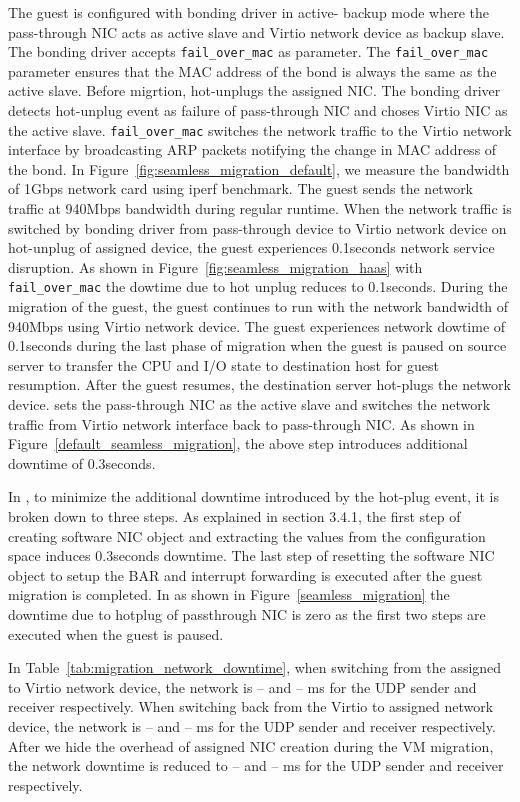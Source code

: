 The guest is configured with bonding driver in active-
backup mode where the pass-through NIC acts as 
active slave and Virtio network device as 
backup slave. The bonding driver accepts 
\texttt{fail\_over\_mac} as parameter. The 
\texttt{fail\_over\_mac} parameter ensures that the
MAC address of the bond is always the same as the active
slave. Before migrtion, \na hot-unplugs the assigned
NIC. The bonding driver detects hot-unplug event as failure
of pass-through NIC and choses
Virtio NIC as the active slave. \texttt{fail\_over\_mac} 
switches the network 
traffic to the Virtio network interface by broadcasting
ARP packets notifying the change in MAC address of the bond.
In Figure~\ref{fig:seamless_migration_default}, we measure 
the bandwidth of 1Gbps network card using iperf benchmark. 
The guest sends the network traffic at 940Mbps bandwidth 
during regular runtime. When the network traffic is 
switched by bonding driver from pass-through device to 
Virtio network device on hot-unplug of assigned device, 
the guest experiences 0.1seconds network service disruption.
As shown in Figure~\ref{fig:seamless_migration_haas} with
\texttt{fail\_over\_mac} the dowtime due to hot unplug reduces 
to 0.1seconds.
During the migration of the guest, the guest continues
to run with the network bandwidth of 940Mbps using Virtio network
device. The guest experiences network dowtime of 
0.1seconds during the last phase of migration 
when the guest is paused on source server
to transfer the CPU and I/O state to destination host
for guest resumption. After the guest resumes, the
destination server hot-plugs the network device. \na
sets the pass-through NIC as the active slave and
switches the network traffic from Virtio network interface
back to pass-through NIC. As shown in 
Figure~\ref{default_seamless_migration}, the above step
introduces additional downtime of 0.3seconds.

In \na, to minimize the additional downtime introduced by
the hot-plug event, it is broken down to three steps.
As explained in section 3.4.1, the first step of creating 
software NIC object and extracting the values from the 
configuration space induces 0.3seconds downtime.
The last step of resetting the software NIC object 
to setup the BAR and interrupt forwarding is executed
after the guest migration is completed. In \na as
shown in Figure~\ref{seamless_migration} the 
downtime due to hotplug of passthrough NIC is zero
as the first two steps are executed when the guest is
paused.

In Table~\ref{tab:migration_network_downtime}, when switching
from the assigned to Virtio network device, the network is --
and -- ms for the UDP sender and receiver respectively. When
switching back from the Virtio to assigned network device, the
network is -- and -- ms for the UDP sender and receiver
respectively. After we hide the overhead of assigned NIC
creation during the VM migration, the network downtime is
reduced to -- and -- ms for the UDP sender and receiver
respectively.

